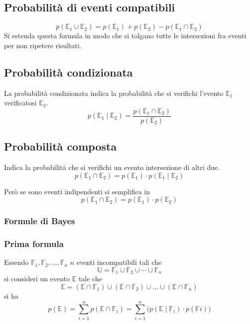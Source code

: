 \subsection{Probabilità di eventi compatibili}
\begin{equation*}
  p(\mathbb{E}_1\cup\mathbb{E}_2) = p(\mathbb{E}_1)+p(\mathbb{E}_2)-p(\mathbb{E}_1\cap\mathbb{E}_2)
\end{equation*}
Si estenda questa formula in modo che si tolgano tutte le intersezioni fra eventi per non ripetere 
risultati.

\subsection{Probabilità condizionata}
La probabilità condizionata indica la probabilità che si verifichi l'evento $\mathbb{E}_1$ 
verificatosi $\mathbb{E}_2$.
\begin{equation*}
  p\left(\mathbb{E}_1\mid\mathbb{E}_2\right) = 
  \frac{p\left(\mathbb{E}_1\cap\mathbb{E}_2\right)}{p(\mathbb{E}_2)}
\end{equation*}

\subsection{Probabilità composta}
Indica la probabilità che si verifichi un evento intersezione di altri due.
\begin{equation*}
  p\left(\mathbb{E}_1\cap\mathbb{E}_2\right) = p(\mathbb{E}_1)\cdot
  p\left(\mathbb{E}_1\mid\mathbb{E}_2\right)
\end{equation*}

Però se sono eventi indipendenti si semplifica in
\begin{equation*}
  p\left(\mathbb{E}_1\cap\mathbb{E}_2\right) = p(\mathbb{E}_1)\cdot p(\mathbb{E}_2)
\end{equation*}

\subsubsection{Formule di Bayes}
\subsubsection{Prima formula}
Essendo $\mathbb{F}_1, \mathbb{F}_2,\dotsc,\mathbb{F}_n$ $n$ eventi incompatibili tali che
\begin{equation*}
  \mathbb{U} = \mathbb{F}_1\cup\mathbb{F}_2\cup\dotsb\cup\mathbb{F}_n
\end{equation*}
si consideri un evento $\mathbb{E}$ tale che
\begin{equation*}
  \mathbb{E} = \left(\mathbb{E}\cap\mathbb{F}_1\right)\cup\left(\mathbb{E}\cap\mathbb{F}_2\right)\cup
  \dots\cup\left(\mathbb{E}\cap\mathbb{F}_n\right)
\end{equation*}
si ha
\begin{equation*}
  p(\mathbb{E}) = \sum\limits_{i=1}^{n}p\left(\mathbb{E}\cap\mathbb{F}_i\right) =
  \sum\limits_{i=1}^{n}\big(p\left(\mathbb{E}\mid\mathbb{F}_i\right)\cdot 
  p\left(\mathbb{F}i\right)\big)
\end{equation*}

